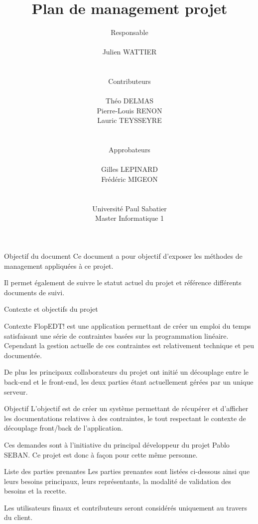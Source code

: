 \documentclass[]{article}
\title{Plan de management projet}
\author{
    Responsable\\
    \\
    Julien WATTIER\\
    \\
    \\
    Contributeurs\\
    \\
    Théo DELMAS\\
    Pierre-Louis RENON\\
    Lauric TEYSSEYRE\\
    \\
    \\
    Approbateurs\\
    \\
    Gilles LEPINARD\\
    Frédéric MIGEON\\
    \\
    \\
    Université Paul Sabatier\\
    Master Informatique 1\\
   }
\date{}
\begin{document}
\maketitle
\newpage
\tableofcontents
\newpage

{
    \setlength{\parindent}{0pt} %
    \begin{section}{\label{sec:Objectif du document}Objectif du document}
     Ce document a pour objectif d'exposer les méthodes de management appliquées à ce projet.

     Il permet également de suivre le statut actuel du projet et référence différents documents de suivi.
    \end{section}

    \begin{section}{\label{sec:Contexte et objectifs du projet}Contexte et objectifs du projet}
     \begin{subsection}{\label{sec:Context}Contexte}
         FlopEDT! est une application permettant de créer un emploi du temps satisfaisant une série de contraintes basées sur la programmation linéaire. Cependant la gestion actuelle de ces contraintes est relativement technique et peu documentée.

         De plus les principaux collaborateurs du projet ont initié un découplage entre le back-end et le front-end, les deux parties étant actuellement gérées par un unique serveur.
     \end{subsection}

     \begin{subsection}{\label{sec:Objectifs}Objectif}
         L’objectif est de créer un système permettant de récupérer et d’afficher les documentations relatives à des contraintes, le tout respectant le contexte de découplage front/back de l'application.

         Ces demandes sont à l’initiative du principal développeur du projet Pablo SEBAN. Ce projet est donc à façon pour cette même personne.
     \end{subsection}

     \begin{subsection}{\label{sec:Liste des parties prenantes}Liste des parties prenantes}
         Les parties prenantes sont listées ci-dessous ainsi que leurs besoins principaux, leurs représentants, la modalité de validation des besoins et la recette.

         Les utilisateurs finaux et contributeurs seront considérés uniquement au travers du client.


\end{subsection}
\end{section}}
\end{document}
